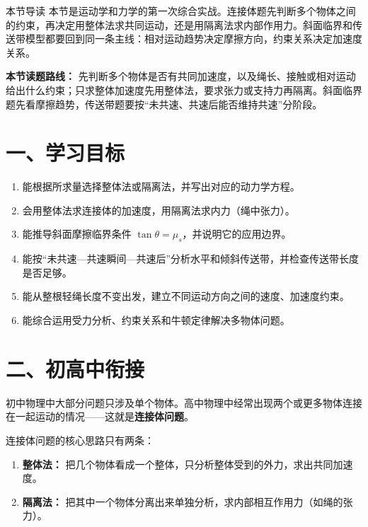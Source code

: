 
\begin{learningbox}{本节导读}
本节是运动学和力学的第一次综合实战。连接体题先判断多个物体之间的约束，再决定用整体法求共同运动，还是用隔离法求内部作用力。斜面临界和传送带模型都要回到同一条主线：相对运动趋势决定摩擦方向，约束关系决定加速度关系。
\end{learningbox}

\textbf{本节读题路线：} 先判断多个物体是否有共同加速度，以及绳长、接触或相对运动给出什么约束；只求整体加速度先用整体法，要求张力或支持力再隔离。斜面临界题先看摩擦趋势，传送带题要按“未共速、共速后能否维持共速”分阶段。

\section*{一、学习目标}

\begin{enumerate}[itemsep=0.65em,topsep=0.4em,parsep=0pt]
  \item 能根据所求量选择整体法或隔离法，并写出对应的动力学方程。
  \item 会用整体法求连接体的加速度，用隔离法求内力（绳中张力）。
  \item 能推导斜面摩擦临界条件 $\tan\theta = \mu_s$，并说明它的应用边界。
  \item 能按“未共速—共速瞬间—共速后”分析水平和倾斜传送带，并检查传送带长度是否足够。
  \item 能从整根轻绳长度不变出发，建立不同运动方向之间的速度、加速度约束。
  \item 能综合运用受力分析、约束关系和牛顿定律解决多物体问题。
\end{enumerate}

\section*{二、初高中衔接}

初中物理中大部分问题只涉及单个物体。高中物理中经常出现两个或更多物体连接在一起运动的情况——这就是\textbf{连接体问题}。

连接体问题的核心思路只有两条：
\begin{enumerate}
  \item \textbf{整体法：} 把几个物体看成一个整体，只分析整体受到的外力，求出共同加速度。
  \item \textbf{隔离法：} 把其中一个物体分离出来单独分析，求内部相互作用力（如绳的张力）。
\end{enumerate}

